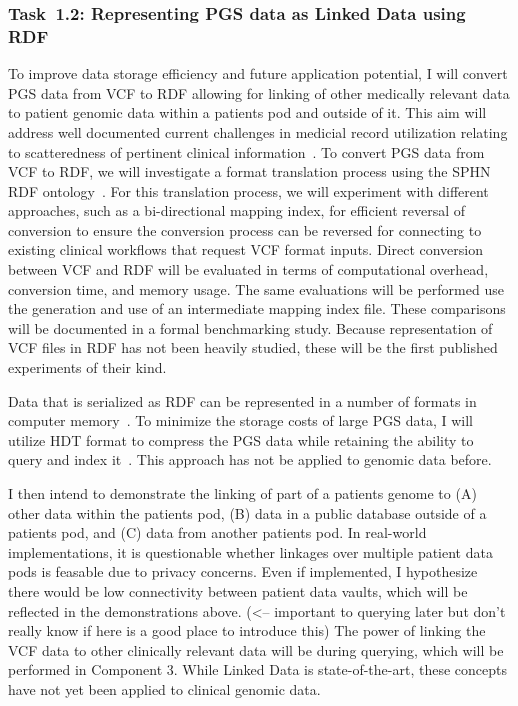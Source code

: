 \documentclass[a4paper,11pt]{article}
\begin{document}
\begin{refsection}
\newcommand\WPab{Representing PGS data as Linked Data using RDF}
\subsubsection{Task~1.2: \WPab}

To improve data storage efficiency and future application potential, I will convert PGS data from VCF to RDF allowing for linking of other medically relevant data to patient genomic data within a patient\textquotesingle s pod and outside of it.
This aim will address well documented current challenges in medicial record utilization relating to scatteredness of pertinent clinical information~\cite{pastorino_benefits_2019}.
To convert PGS data from VCF to RDF, we will investigate a format translation process using the SPHN RDF ontology~\cite{van_der_horst_bridging_2023}. 
For this translation process, we will experiment with different approaches, such as a bi-directional mapping index, for efficient reversal of conversion to ensure the conversion process can be reversed for connecting to existing clinical workflows that request VCF format inputs. 
Direct conversion between VCF and RDF will be evaluated in terms of computational overhead, conversion time, and memory usage.
The same evaluations will be performed use the generation and use of an intermediate mapping index file. 
These comparisons will be documented in a formal benchmarking study.
Because representation of VCF files in RDF has not been heavily studied, these will be the first published experiments of their kind.

Data that is serialized as RDF can be represented in a number of formats in computer memory~\cite{rdf_serializations}.
To minimize the storage costs of large PGS data, I will utilize HDT format to compress the PGS data while retaining the ability to query and index it~\cite{hdt}.
This approach has not be applied to genomic data before.

I then intend to demonstrate the linking of part of a patient\textquotesingle s genome to
(A) other data within the patient\textquotesingle s pod, 
(B) data in a public database outside of a patient\textquotesingle s pod, and
(C) data from another patient\textquotesingle s pod.
In real-world implementations, it is questionable whether linkages over multiple patient data pods is feasable due to privacy concerns.
Even if implemented, I hypothesize there would be low connectivity between patient data vaults, which will be reflected in the demonstrations above. (<-- important to querying later but don't really know if here is a good place to introduce this)
The power of linking the VCF data to other clinically relevant data will be during querying, which will be performed in Component 3.
While Linked Data is state-of-the-art, these concepts have not yet been applied to clinical genomic data.



\end{refsection}
\end{document}
